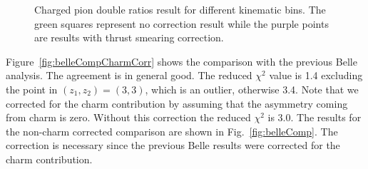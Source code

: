 \begin{figure}[H]
  \centering     
  \caption{Charged pion double ratios result for different kinematic bins. The green squares represent no correction result while the purple points are results with thrust smearing correction.}
\label{fig:chargedpion}
\end{figure}
\fi
Figure~\ref{fig:belleCompCharmCorr} shows the comparison with the previous Belle analysis. The agreement is in general good. The reduced $\chi^2$ value is 1.4 excluding the point in $(z_1,z_2)=(3,3)$, which is an outlier, otherwise 3.4.
Note that we corrected for the charm contribution by assuming that the asymmetry coming from charm is zero. Without this correction the reduced $\chi^2$ is 3.0. The results for the non-charm corrected comparison are shown in Fig.~\ref{fig:belleComp}. The correction is necessary since the previous Belle results were corrected for the charm contribution.

